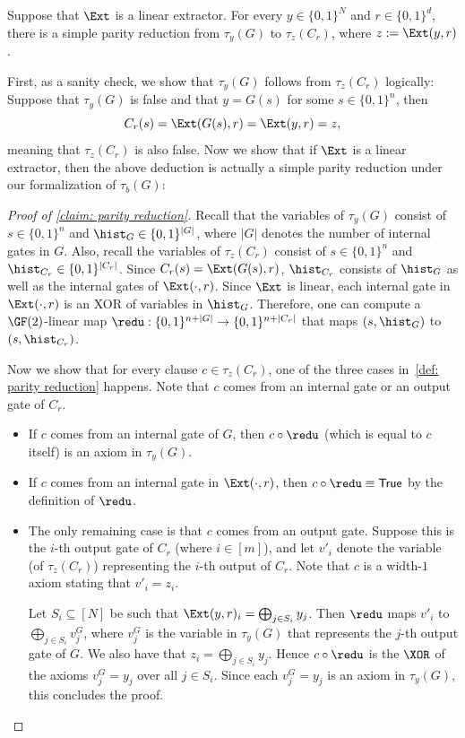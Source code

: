 \begin{claim}\label{claim: parity reduction}
	Suppose that $\Ext$ is a linear extractor. For every $y\in\{0, 1\}^N$ and $r \in \{0, 1\}^d$, there is a simple parity reduction from $\tau_y(G)$ to $\tau_z(C_r)$, where $z := \Ext(y, r)$.
\end{claim}
First, as a sanity check, we show that $\tau_y(G)$ follows from $\tau_z(C_r)$ logically: Suppose that $\tau_y(G)$ is false and that $y = G(s)$ for some $s\in\{0, 1\}^n$, then
\[C_r(s) = \Ext(G(s), r) = \Ext(y, r) = z,\]
meaning that $\tau_z(C_r)$ is also false. Now we show that if $\Ext$ is a linear extractor, then the above deduction is actually a simple parity reduction under our formalization of $\tau_b(G)$:
\begin{proof}[Proof of \autoref{claim: parity reduction}]
	Recall that the variables of $\tau_y(G)$ consist of $s\in\{0, 1\}^n$ and $\hist_G\in\{0, 1\}^{|G|}$, where $|G|$ denotes the number of internal gates in $G$. Also, recall the variables of $\tau_z(C_r)$ consist of $s\in\{0, 1\}^n$ and $\hist_{C_r}\in\{0, 1\}^{|C_r|}$. Since $C_r(s) = \Ext(G(s), r)$, $\hist_{C_r}$ consists of $\hist_G$ as well as the internal gates of $\Ext(\cdot, r)$. Since $\Ext$ is linear, each internal gate in $\Ext(\cdot, r)$ is an XOR of variables in $\hist_G$. Therefore, one can compute a $\GF(2)$-linear map $\redu: \{0, 1\}^{n + |G|} \to \{0, 1\}^{n + |C_r|}$ that maps $(s, \hist_G)$ to $(s, \hist_{C_r})$.

	Now we show that for every clause $c \in \tau_z(C_r)$, one of the three cases in~\autoref{def: parity reduction} happens. Note that $c$ comes from an internal gate or an output gate of $C_r$.\begin{itemize}
		\item If $c$ comes from an internal gate of $G$, then $c\circ \redu$ (which is equal to $c$ itself) is an axiom in $\tau_y(G)$.
		\item If $c$ comes from an internal gate in $\Ext(\cdot, r)$, then $c\circ \redu \equiv {\sf True}$ by the definition of $\redu$.
		\item The only remaining case is that $c$ comes from an output gate. Suppose this is the $i$-th output gate of $C_r$ (where $i\in[m]$), and let $v'_i$ denote the variable (of $\tau_z(C_r)$) representing the $i$-th output of $C_r$. Note that $c$ is a width-$1$ axiom stating that $v'_i = z_i$.
        
        Let $S_i \subseteq [N]$ be such that $\Ext(y, r)_i = \bigoplus_{j\in S_i}y_j$. Then $\redu$ maps $v'_i$ to $\bigoplus_{j\in S_i}v^G_j$, where $v^G_j$ is the variable in $\tau_y(G)$ that represents the $j$-th output gate of $G$. We also have that $z_i = \bigoplus_{j\in S_i}y_j$. Hence $c\circ\redu$ is the $\XOR$ of the axioms $v^G_j = y_j$ over all $j\in S_i$. Since each $v^G_j = y_j$ is an axiom in $\tau_y(G)$, this concludes the proof. \qedhere
	\end{itemize}
\end{proof}

